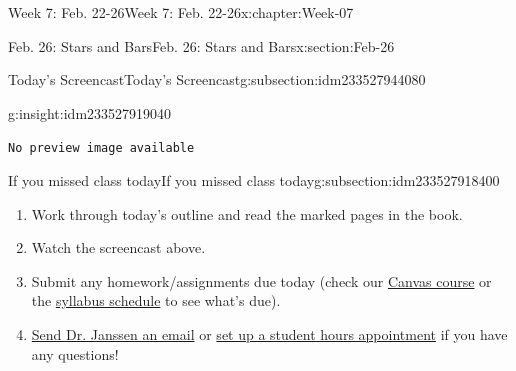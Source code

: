 \documentclass[oneside,10pt,]{book}
\newcommand{\mono}[1]{\texttt{#1}}
\numberwithin{equation}{section}
\newlength{\qrsize}
\newlength{\previewwidth}
\begin{document}
\begin{chapterptx}{Week 7: Feb. 22-26}{}{Week 7: Feb. 22-26}{}{}{x:chapter:Week-07}
\begin{sectionptx}{Feb. 26: Stars and Bars}{}{Feb. 26: Stars and Bars}{}{}{x:section:Feb-26}
\begin{subsectionptx}{Today's Screencast}{}{Today's Screencast}{}{}{g:subsection:idm233527944080}
\begin{insight}{}{g:insight:idm233527919040}%
\setlength{\qrsize}{9em}
\setlength{\previewwidth}{\linewidth}
\addtolength{\previewwidth}{-\qrsize}
\begin{tcbraster}[raster columns=2, raster column skip=1pt, raster halign=center, raster force size=false, raster left skip=0pt, raster right skip=0pt]%
\begin{tcolorbox}[previewstyle, width=\previewwidth]%
\mono{No preview image available}%
\end{tcolorbox}%
\begin{tcolorbox}[qrstyle]%
[QR LINK]\end{tcolorbox}%
\end{tcbraster}%
\end{insight}
\end{subsectionptx}
%
%
\typeout{************************************************}
\typeout{************************************************}
%
\begin{subsectionptx}{If you missed class today}{}{If you missed class today}{}{}{g:subsection:idm233527918400}
%
\begin{enumerate}
\item{}Work through today's outline and read the marked pages in the book.%
\item{}Watch the screencast above.%
\item{}Submit any homework\slash{}assignments due today (check our \href{https://dordt.instructure.com/courses/3110050}{Canvas course} or the \href{https://prof.mkjanssen.org/ds/index.html\#schedule}{syllabus schedule} to see what's due).%
\item{}\href{mailto:mike.janssen@dordt.edu}{Send Dr. Janssen an email} or \href{https://calendly.com/mkjanssen/student-hours}{set up a student hours appointment} if you have any questions!%
\end{enumerate}
\end{subsectionptx}
\end{sectionptx}
\end{chapterptx}
%
%
\typeout{************************************************}
\typeout{************************************************}
%
\end{document}
